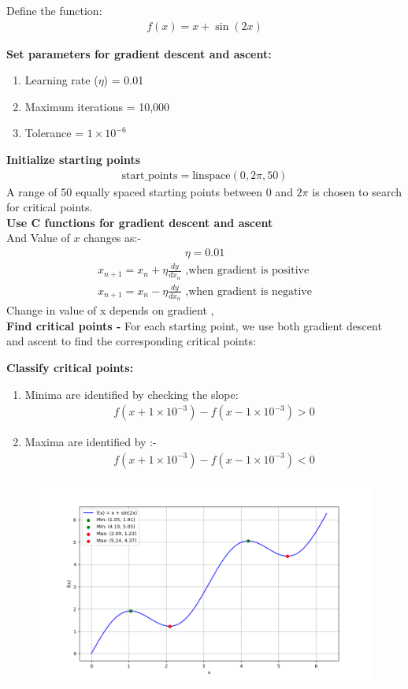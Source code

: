 \documentclass[journal]{IEEEtran}
\numberwithin{equation}{enumi}
\numberwithin{figure}{enumi}
\begin{document}
\begin{enumerate}
Define the function:
    \begin{align}
    f(x) = x + \sin(2x)
    \end{align}

    \textbf{Set parameters for gradient descent and ascent:}
    \begin{enumerate}
        \item Learning rate ($ \eta $) = 0.01
        \item Maximum iterations  = 10,000
        \item Tolerance  = $1 \times 10^{-6}$
    \end{enumerate}
    
    \textbf{Initialize starting points}
    \begin{align}
    \text{start\_points} = \text{linspace}(0, 2\pi, 50)
    \end{align}
    A range of 50 equally spaced starting points between $0$ and $2\pi$ is chosen to search for critical points.\\
    
    \textbf{Use C functions for gradient descent and ascent}\\
     And Value of $x$ changes as:-
     \begin{align}
     \eta = 0.01
     \end{align}
     \begin{align}
     x_{n+1} = x_{n} + \eta\frac{dy}{dx_n} \text{ ,when gradient is positive}\\
     x_{n+1} = x_{n} - \eta\frac{dy}{dx_n} \text{ ,when gradient is negative}
     \end{align}
     Change in value of x depends on gradient ,\\
     \textbf{Find critical points - }
     For each starting point, we use both gradient descent and ascent to find the corresponding critical points:

     \textbf{Classify critical points:}
     \begin{enumerate}
        \item Minima are identified by checking the slope:
        \begin{align}
        f(x + 1 \times 10^{-3}) - f(x - 1 \times 10^{-3}) > 0
        \end{align}
        \item Maxima are identified by :-
        \begin{align}
        f(x + 1 \times 10^{-3}) - f(x - 1 \times 10^{-3}) < 0
        \end{align}
    \end{enumerate}
    
\end{enumerate}
\begin{figure}[h!]
   \centering
   \includegraphics[width=0.7\linewidth]{figs/Figure_1.png}
\end{figure}
\end{document}
